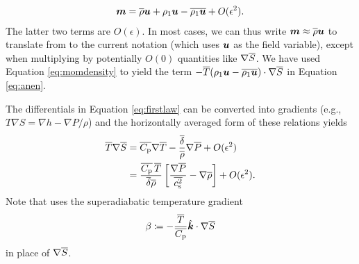 \documentclass[12pt]{article}
\newcommand{\veck}{\hat{\bm{k}}}
\newcommand{\deltaref}{\overline{\delta}}
\newcommand{\cpref}{\overline{\cpcap}}
\newcommand{\cssqref}{\overline{\cs^2}}
\begin{document}
  \begin{align}\label{eq:momdensity}
  	\bm{m} = \overline{\rho}\bm{u} + \rho_1\bm{u} - \overline{\rho_1\bm{u}} + O(\epsilon^2).
  \end{align}
  The latter two terms are $O(\epsilon)$. In most cases, we can thus write $\bm{m} \approx \overline{\rho} \bm{u}$ to translate from \citet{Gough1969} to the current notation (which uses $\bm{u}$ as the field variable), except when multiplying by potentially $O(0)$ quantities like $\nabla\overline{S}$. We have used Equation \eqref{eq:momdensity} to yield the term $- \overline{T}(\rho_1\bm{u}-\overline{\rho_1\bm{u}})\cdot\nabla\overline{S}$ in Equation \eqref{eq:anen}. 
  
  The differentials in Equation \eqref{eq:firstlaw} can be converted into gradients (e.g., $T\nabla S= \nabla h - \nabla P/\rho$) and the horizontally averaged form of these relations yields 
  \begin{subequations}\label{eq:anfirstlaw}
  \begin{align}
  	\tmpref\nabla\sref &= \cpref\nabla\tmpref - \frac{\deltaref}{\rhoref}\nabla\prsref + O(\epsilon^2)\\
  	 &= \frac{\cpref\,\tmpref}{\deltaref\rhoref}\left[\frac{\nabla\prsref}{\cssqref}-\nabla\rhoref\right]+O(\epsilon^2).
  \end{align}
  \end{subequations}
  Note that \citet{Gough1969} uses the superadiabatic temperature gradient
  \begin{align}
  	\beta\define -\frac{\tmpref}{\cpref}\veck\dotgrad\sref
  \end{align}
  in place of $\nabla \overline{S}$. 
  
\end{document}
